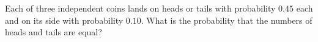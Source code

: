 Each of three independent coins lands on heads or tails with probability $0.45$ each and on its side with probability $0.10$. What is the probability that the numbers of heads and tails are equal?
